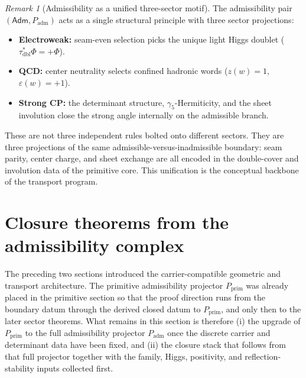 \documentclass[11pt,a4paper]{article}
\theoremstyle{definition}
\theoremstyle{remark}
\newtheorem*{remark}{Remark}
\newcommand{\taudbl}{\tau_{\mathrm{dbl}}}
\newcommand{\Padm}{P_{\mathrm{adm}}}
\newcommand{\Pprim}{P_{\mathrm{prim}}}
\begin{document}
\begin{remark}[Admissibility as a unified three-sector motif]
The admissibility pair $(\mathsf{Adm},\Padm)$ acts as a single structural principle with three sector projections:
\begin{itemize}[leftmargin=1.5em, topsep=3pt, itemsep=2pt]
    \item \textbf{Electroweak:} seam-even selection picks the unique light Higgs doublet ($\taudbl^{\ast}\Phi=+\Phi$).
    \item \textbf{QCD:} center neutrality selects confined hadronic words ($z(w)=1$, $\varepsilon(w)=+1$).
    \item \textbf{Strong CP:} the determinant structure, $\gamma_5$-Hermiticity, and the sheet involution close the strong angle internally on the admissible branch.
\end{itemize}
These are not three independent rules bolted onto different sectors. They are three projections of the same admissible-versus-inadmissible boundary: seam parity, center charge, and sheet exchange are all encoded in the double-cover and involution data of the primitive core. This unification is the conceptual backbone of the transport program.
\end{remark}

\section{Closure theorems from the admissibility complex}
\label{sec:closure-theorems}

The preceding two sections introduced the carrier-compatible geometric and transport architecture.
The primitive admissibility projector $\Pprim$ was already placed in the primitive section so
that the proof direction runs from the boundary datum through the derived closed datum to $\Pprim$, and only then to the later
sector theorems. What remains in this section is therefore (i) the upgrade of $\Pprim$ to the
full admissibility projector $\Padm$ once the discrete carrier and determinant data have been
fixed, and (ii) the closure stack that follows from that full projector together with the family,
Higgs, positivity, and reflection-stability inputs collected first.
\end{document}
